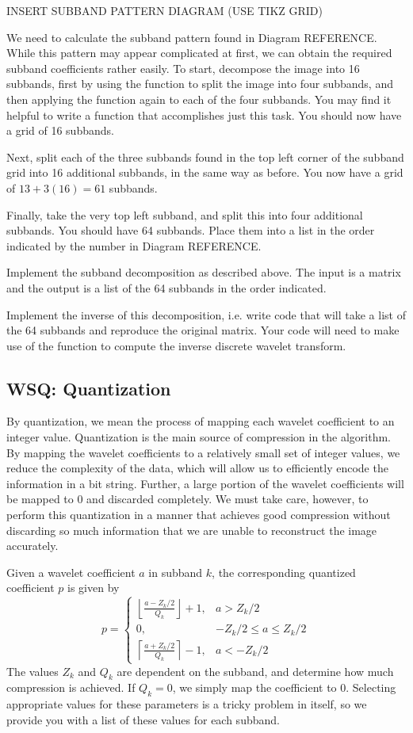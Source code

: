 INSERT SUBBAND PATTERN DIAGRAM (USE TIKZ GRID)

We need to calculate the subband pattern found in Diagram REFERENCE.
While this pattern may appear complicated at first, we can obtain the
required subband coefficients rather easily. To start, decompose the image
into 16 subbands, first by using the  function to split the 
image into four subbands, and then applying the function again to each of the
four subbands. You may find it helpful to write a function that accomplishes 
just this task. You should now have a grid of 16 subbands.

Next, split each of the three subbands found in the top left corner of the subband 
grid into 16 additional subbands, in the same way as before. You now have a grid
of $13 + 3(16) = 61$ subbands. 

Finally, take the very top left subband, and split this into four additional subbands.
You should have 64 subbands. Place them into a list in the order indicated by 
the number in Diagram REFERENCE.

\begin{problem}
Implement the subband decomposition as described above. The input is a matrix
and the output is a list of the 64 subbands in the order indicated.

Implement the inverse of this decomposition, i.e. write code that will take
a list of the 64 subbands and reproduce the original matrix. Your code will
need to make use of the  function to compute the inverse discrete
wavelet transform.
\end{problem}

\subsection*{WSQ: Quantization}
By quantization, we mean the process of mapping each wavelet coefficient to an 
integer value. Quantization is the main source of compression in the algorithm. By mapping
the wavelet coefficients to a relatively small set of integer values, we reduce
the complexity of the data, which will allow us to efficiently encode the information
in a bit string. Further, a large portion of the wavelet coefficients will be mapped to 0
and discarded completely. We must take care, however, to perform this quantization in a
manner that achieves good compression without discarding so much information that we 
are unable to reconstruct the image accurately.

Given a wavelet coefficient $a$ in subband $k$, the corresponding quantized
coefficient $p$ is given by
\[
p = 
\begin{cases}
   \left\lfloor\frac{a-Z_k/2}{Q_k}\right\rfloor + 1, & a> Z_k/2 \\
   0,       & -Z_k/2 \leq a \leq Z_k/2\\
   \left\lceil\frac{a + Z_k/2}{Q_k}\right\rceil - 1, & a < -Z_k/2
  \end{cases}
\]
The values $Z_k$ and $Q_k$ are dependent on the subband, and determine how much
compression is achieved. If $Q_k=0$, we simply map the coefficient to 0. 
Selecting appropriate values for these parameters is a
tricky problem in itself, so we provide you with a list of these values for each 
subband.

